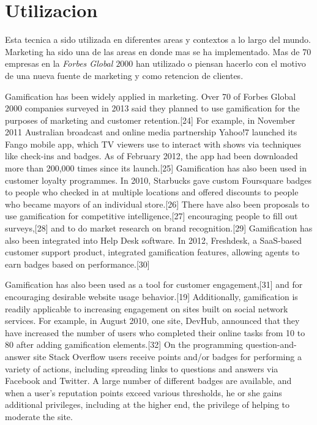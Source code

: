 \section{Utilizacion}

Esta tecnica a sido utilizada en diferentes areas y contextos a lo largo del mundo. Marketing ha sido una 
de las areas en donde mas se ha implementado. Mas de 70 empresas en la \emph{Forbes Global $2000$} han
utilizado o piensan hacerlo con el motivo de una nueva fuente de marketing y como retencion de clientes\cite{Gam:Util:1}.

Gamification has been widely applied in marketing. Over 70 of Forbes Global 2000 companies surveyed in 2013 said they planned to use gamification for the purposes of marketing and customer retention.[24] For example, in November 2011 Australian broadcast and online media partnership Yahoo!7 launched its Fango mobile app, which TV viewers use to interact with shows via techniques like check-ins and badges. As of February 2012, the app had been downloaded more than 200,000 times since its launch.[25] Gamification has also been used in customer loyalty programmes. In 2010, Starbucks gave custom Foursquare badges to people who checked in at multiple locations and offered discounts to people who became mayors of an individual store.[26] There have also been proposals to use gamification for competitive intelligence,[27] encouraging people to fill out surveys,[28] and to do market research on brand recognition.[29] Gamification has also been integrated into Help Desk software. In 2012, Freshdesk, a SaaS-based customer support product, integrated gamification features, allowing agents to earn badges based on performance.[30]

Gamification has also been used as a tool for customer engagement,[31] and for encouraging desirable website usage behavior.[19] Additionally, gamification is readily applicable to increasing engagement on sites built on social network services. For example, in August 2010, one site, DevHub, announced that they have increased the number of users who completed their online tasks from 10 to 80 after adding gamification elements.[32] On the programming question-and-answer site Stack Overflow users receive points and/or badges for performing a variety of actions, including spreading links to questions and answers via Facebook and Twitter. A large number of different badges are available, and when a user's reputation points exceed various thresholds, he or she gains additional privileges, including at the higher end, the privilege of helping to moderate the site.

